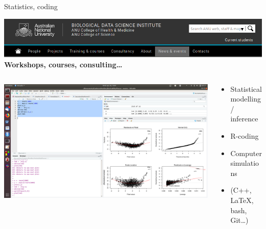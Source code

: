 \documentclass[10pt]{beamer}%
\begin{document}
\begin{frame}{Statistics, coding}
\begin{center}
\includegraphics[width=1\textwidth]{Figures/bdsi}
\textbf{Workshops, courses, consulting\dots}
\end{center}

\begin{columns}[c]
\begin{column}{0.5\textwidth}
\includegraphics[width=1\textwidth]{Figures/rstudio}
\end{column}
\begin{column}{0.5\textwidth}
    \begin{itemize}
        \item Statistical modelling / inference
        \item R-coding
        \item Computer simulations
        \item (C++, \LaTeX, bash, Git\dots)
    \end{itemize}
\end{column}
\end{columns}

\end{frame}
\end{document}
